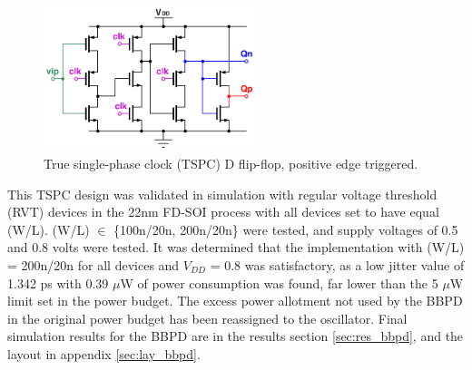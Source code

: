			\begin{figure}[htb!]
			        \centering
			        \includegraphics[width=0.55\textwidth, angle=0]{./figs/design/tspc_}
			    \caption{True single-phase clock (TSPC) D flip-flop, positive edge triggered.}
			    \label{fig:tspc_dff}
			\end{figure}

		This TSPC design was validated in simulation with regular voltage threshold (RVT) devices in the 22nm FD-SOI process with all devices set to have equal (W/L). (W/L) $\in$ \{100n/20n, 200n/20n\} were tested, and supply voltages of 0.5 and 0.8 volts were tested. It was determined that the implementation with (W/L) = 200n/20n for all devices and $V_{DD}$ = 0.8 was satisfactory, as a low jitter value of 1.342 ps with 0.39 $\mu$W of power consumption was found, far lower than the 5 $\mu$W limit set in the power budget. The excess power allotment not used by the BBPD in the original power budget has been reassigned to the oscillator. Final simulation results for the BBPD are in the results section \ref{sec:res_bbpd}, and the layout in appendix \ref{sec:lay_bbpd}.




